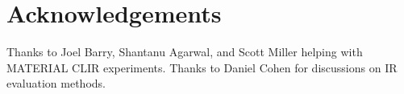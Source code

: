 \section*{Acknowledgements}

Thanks to Joel Barry, Shantanu Agarwal, and Scott Miller helping with MATERIAL CLIR experiments.
Thanks to Daniel Cohen for discussions on IR evaluation methods. 
